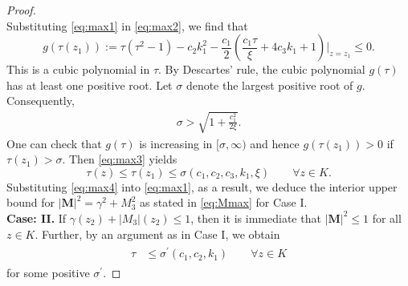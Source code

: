 \documentclass{article}
\def \Mvec{\mathbf{M}}
\begin{document}
\begin{proof}
\begin{equation}
\end{equation}
Substituting \eqref{eq:max1} in \eqref{eq:max2}, we find that
\begin{equation} \label{eq:max3}
    g\left(\tau(z_1)\right) := \tau(\tau^2 -1 ) - c_2 k_1^2 - \frac{c_1}{2} \left(\frac{c_1\tau}{\xi} + 4 c_3k_1 + 1 \right) \bigg|_{z=z_1} \le 0.
\end{equation}This is a cubic polynomial in $\tau$. By Descartes' rule, the cubic polynomial $g\left(\tau\right)$ has at least one positive root. Let $\sigma$ denote the largest positive root of $g$. Consequently,
\begin{eqnarray} \label{sigma-sqrt}
\sigma > \sqrt{ 1 + \frac{c_1^2}{2\xi}}.
\end{eqnarray}
One can check that $g\left(\tau\right)$ is increasing in $[\sigma, \infty)$ and hence $g\left(\tau\left(z_1\right)\right) >0$ if $\tau(z_1) > \sigma$. Then \eqref{eq:max3} yields
\begin{equation} \label{eq:max4}
\tau(z)\leq\tau\left(z_1\right) \leq \sigma( c_1, c_2, c_3, k_1, \xi) \qquad \forall z \in K.
\end{equation}
Substituting \eqref{eq:max4} into \eqref{eq:max1}, as a result, we deduce the interior upper bound for $|\Mvec|^2 = \gamma^2 + M_3^2$ as stated in \eqref{eq:Mmax} for Case I.\newline\\
\textbf{Case: II.} If $\gamma(z_2) + |M_3|(z_2) \leq 1$, then it is immediate that $|\Mvec|^2 \leq 1$ for all $z \in K$. Further, by an argument as in Case I, we obtain
\begin{eqnarray}
\begin{aligned}
\tau &\leq \sigma^{\prime}\left(c_1, c_2, k_1\right) \qquad \forall z \in K
\end{aligned}
\end{eqnarray}
for some positive $\sigma^{\prime}$. 
\end{proof}
\end{document}
